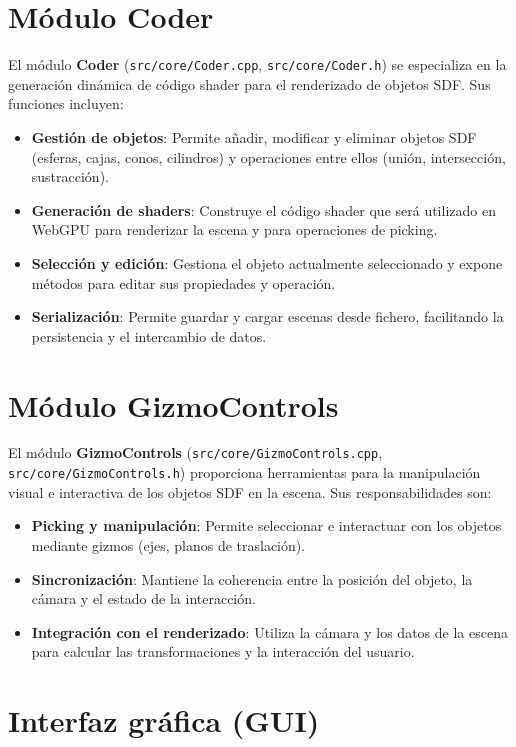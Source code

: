 \section{Módulo Coder}

El módulo \textbf{Coder} (\texttt{src/core/Coder.cpp},
\texttt{src/core/Coder.h}) se especializa en la generación dinámica de código
shader para el renderizado de objetos SDF. Sus funciones incluyen:
\begin{itemize}
    \item \textbf{Gestión de objetos}: Permite añadir, modificar y eliminar objetos SDF (esferas, cajas, conos, cilindros) y operaciones entre ellos (unión, intersección, sustracción).
    \item \textbf{Generación de shaders}: Construye el código shader que será utilizado en WebGPU para renderizar la escena y para operaciones de picking.
    \item \textbf{Selección y edición}: Gestiona el objeto actualmente seleccionado y expone métodos para editar sus propiedades y operación.
    \item \textbf{Serialización}: Permite guardar y cargar escenas desde fichero, facilitando la persistencia y el intercambio de datos.
\end{itemize}

\section{Módulo GizmoControls}

El módulo \textbf{GizmoControls} (\texttt{src/core/GizmoControls.cpp},
\texttt{src/core/GizmoControls.h}) proporciona herramientas para la
manipulación visual e interactiva de los objetos SDF en la escena. Sus
responsabilidades son:
\begin{itemize}
    \item \textbf{Picking y manipulación}: Permite seleccionar e interactuar con los objetos mediante gizmos (ejes, planos de traslación).
    \item \textbf{Sincronización}: Mantiene la coherencia entre la posición del objeto, la cámara y el estado de la interacción.
    \item \textbf{Integración con el renderizado}: Utiliza la cámara y los datos de la escena para calcular las transformaciones y la interacción del usuario.
\end{itemize}

\section{Interfaz gráfica (GUI)}


